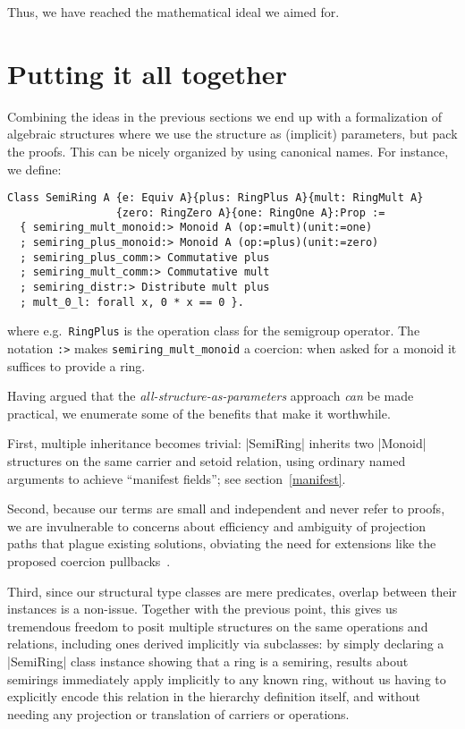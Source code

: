 \documentclass[a4paper,10pt,runningheads]{llncs}
\begin{document}
Thus, we have reached the mathematical ideal we aimed for.

\section{Putting it all together}\label{classes}
Combining the ideas in the previous sections we end up with a formalization of algebraic
structures where we use the structure as (implicit) parameters, but
pack the proofs. This can be nicely organized by using canonical names. For instance, we define:
\begin{lstlisting}
Class SemiRing A {e: Equiv A}{plus: RingPlus A}{mult: RingMult A}
                 {zero: RingZero A}{one: RingOne A}:Prop :=
  { semiring_mult_monoid:> Monoid A (op:=mult)(unit:=one)
  ; semiring_plus_monoid:> Monoid A (op:=plus)(unit:=zero)
  ; semiring_plus_comm:> Commutative plus
  ; semiring_mult_comm:> Commutative mult
  ; semiring_distr:> Distribute mult plus
  ; mult_0_l: forall x, 0 * x == 0 }.
\end{lstlisting}

where e.g.\ \lstinline|RingPlus| is the operation class for the semigroup operator.
The notation \lstinline|:>| makes \lstinline|semiring_mult_monoid| a coercion: when asked for a monoid it suffices to
provide a ring.

Having argued that the \emph{all-structure-as-parameters} approach \emph{can} be made practical, we enumerate some of the benefits that make it worthwhile.

First, multiple inheritance becomes trivial: |SemiRing| inherits two |Monoid| structures on the same carrier and setoid relation, using ordinary named arguments to achieve ``manifest fields''; see section~\ref{manifest}.

Second, because our terms are small and independent and never refer to proofs, we are invulnerable to concerns about efficiency and ambiguity of projection paths that plague existing solutions, obviating the need for extensions like the proposed coercion pullbacks~\cite{Hints}.

Third, since our structural type classes are mere predicates, overlap between their instances is a non-issue. Together with the previous point, this gives us tremendous freedom to posit multiple structures on the same operations and relations, including ones derived implicitly via subclasses: by simply declaring a |SemiRing| class instance showing that a ring is a semiring, results about semirings immediately apply implicitly to any known ring, without us having to explicitly encode this relation in the hierarchy definition itself, and without needing any projection or translation of carriers or operations.
\end{document}
